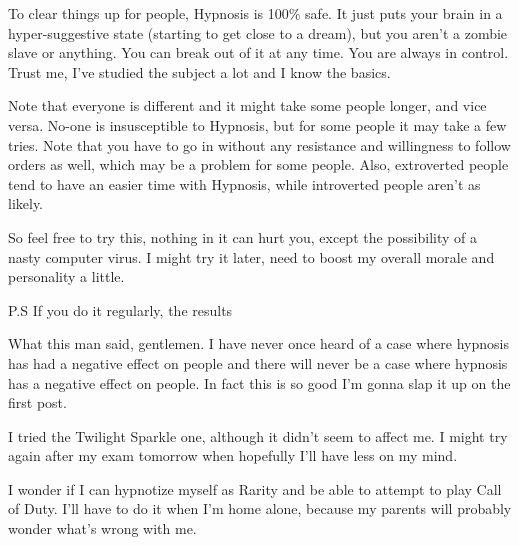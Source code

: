 \documentclass[ebook,12pt,oneside,openany]{memoir}
\begin{document}
\begin{tcolorbox}[title=Lord Bababa,colback=red!5!white,colframe=red!75!black,coltitle=white]
\begin{tcolorbox}[title=Dev]
\par{To clear things up for people, Hypnosis is 100\% safe. It just puts your brain in a hyper-suggestive state (starting to get close to a dream), but you aren't a zombie slave or anything. You can break out of it at any time. You are always in control. Trust me, I've studied the subject a lot and I know the basics.}
\newline{}
\par{Note that everyone is different and it might take some people longer, and vice versa. No-one is insusceptible to Hypnosis, but for some people it may take a few tries. Note that you have to go in without any resistance and willingness to follow orders as well, which may be a problem for some people. Also, extroverted people tend to have an easier time with Hypnosis, while introverted people aren't as likely.}
\newline{}
\par{So feel free to try this, nothing in it can hurt you, except the possibility of a nasty computer virus. I might try it later, need to boost my overall morale and personality a little.}
\newline{}
\par{P.S If you do it regularly, the results}
\end{tcolorbox}
\par{What this man said, gentlemen. I have never once heard of a case where hypnosis has had a negative effect on people and there will never be a case where hypnosis has a negative effect on people. In fact this is so good I'm gonna slap it up on the first post.}
\end{tcolorbox}
\begin{tcolorbox}[title=Sam]
\par{I tried the Twilight Sparkle one, although it didn't seem to affect me. I might try again after my exam tomorrow when hopefully I'll have less on my mind.}
\end{tcolorbox}
\begin{tcolorbox}[title=Rolls Royce]
\par{I wonder if I can hypnotize myself as Rarity and be able to attempt to play Call of Duty.  I'll have to do it when I'm home alone, because my parents will probably wonder what's wrong with me.}
\end{tcolorbox}
\end{document}
